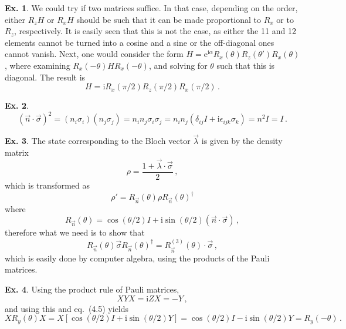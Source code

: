 \documentclass[a4paper,12pt]{article}
\def\e{\mathrm{e}}
\def\imagi{\mathrm{i}}
\theoremstyle{definition}
\newtheorem{exercise}{Ex.}[section]
\begin{document}
\begin{exercise}
 We could try if two matrices suffice. In that case, depending on the order, either $R_z H$ or $R_x H$ should be such that it can be made proportional to $R_x$ or to $R_z$, respectively. It is easily seen that this is not the case, as either the 11 and 12 elements cannot be turned into a cosine and a sine or the off-diagonal ones cannot vanish. Next, one would consider the form $H = \e^{\imagi \alpha} R_x(\theta) R_z(\theta') R_x(\theta)$, where examining $R_x(-\theta)H R_x(-\theta)$, and solving for $\theta$ such that this is diagonal. The result is
 \[
  H = \imagi R_x(\pi/2) R_z(\pi/2) R_x(\pi/2)\,.
 \]
\end{exercise}

\begin{exercise}
 \[
(\vec{n}\cdot\vec{\sigma})^2 = (n_i \sigma_i)(n_j\sigma_j) = n_i n_j \sigma_i \sigma_j = n_i n_j (\delta_{ij}I+\imagi\epsilon_{ijk}\sigma_k) = n^2 I = I\,.  
 \]
\end{exercise}

\begin{exercise}
 The state corresponding to the Bloch vector $\vec{\lambda}$ is given by the density matrix
 \[
  \rho = \frac{1+\vec{\lambda}\cdot\vec{\sigma}}{2}\,,
 \]
 which is transformed as
 \[
  \rho' = R_{\vec{n}}(\theta) \rho R_{\vec{n}}(\theta)^\dagger
 \]
 where
 \[
  R_{\vec{n}}(\theta) = \cos(\theta/2) I + \imagi \sin(\theta/2) (\vec{n}\cdot\vec{\sigma})\,,
 \]
 therefore what we need is to show that
 \[
  R_{\vec{n}}(\theta) \vec{\sigma} R_{\vec{n}}(\theta)^\dagger = R^{(3)}_{\vec{n}}(\theta) \cdot \vec{\sigma}\,,
 \]
 which is easily done by computer algebra, using the products of the Pauli matrices.
\end{exercise}

\begin{exercise}
 Using the product rule of Pauli matrices,
 \[
  XYX = \imagi Z X = - Y\,,
 \]
 and using this and eq.\ (4.5) yields
 \[
  X R_y(\theta) X = X\left[\cos(\theta/2) I + \imagi \sin(\theta/2) Y\right] = \cos(\theta/2) I - \imagi \sin(\theta/2) Y = R_y(-\theta)\,.
 \]
\end{exercise}
\end{document}
